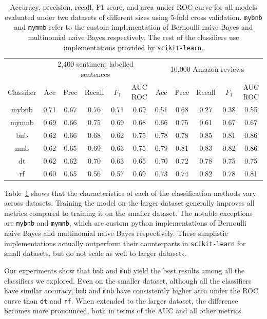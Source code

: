 \documentclass{article} %
\begin{document}
\begin{table}[htbp]
\small
   \centering
   \begin{tabular}{|c|c|c|c|c|c|c|c|c|c|c|}
   \hline
    &  \multicolumn{5}{c|}{2,400 sentiment labelled sentences} &
  \multicolumn{5}{c|}{10,000 Amazon reviews}  \\
  \cline{2-11}
   Classifier & Acc & Prec & Recall & $F_1$ & AUC ROC & Acc & Prec & Recall & $F_1$ & AUC ROC \\ \hline \hline
   mybnb & 0.71 & 0.67 & 0.76 & 0.71 & 0.69 & 0.51 & 0.68 & 0.27 & 0.38 & 0.55 \\\hline
   mymnb & 0.69 & 0.66 & 0.75 & 0.69 & 0.68 & 0.66 & 0.75 & 0.61 & 0.67 & 0.67 \\\hline
   bnb & 0.62 & 0.66 & 0.68 & 0.62 & 0.75 & 0.78 & 0.78 & 0.85 & 0.81 & 0.86 \\\hline
   mnb & 0.62 & 0.65 & 0.69 & 0.63 & 0.75 & 0.79 & 0.81 & 0.83 & 0.82 & 0.86 \\\hline
   dt & 0.62 & 0.62 & 0.70 & 0.63 & 0.65 & 0.70 & 0.72 & 0.78 & 0.75 & 0.75 \\\hline
   rf & 0.60 & 0.65 & 0.56 & 0.57 & 0.69 & 0.73 & 0.74 & 0.82 & 0.78 & 0.81 \\\hline
   \end{tabular}
   \caption{Accuracy, precision, recall, F1 score, and area under ROC curve for all models evaluated under two datasets of different sizes using 5-fold cross validation. \texttt{mybnb} and \texttt{mymnb} refer to the custom implementation of Bernoulli naive Bayes and multinomial naive Bayes respectively. The rest of the classifiers use implementations provided by \texttt{scikit-learn}.}
   \label{tab:classifiers}
\end{table}

Table~\ref{tab:classifiers} shows that the characteristics of each of the classification methods vary across datasets. Training the model on the larger dataset generally improves all metrics compared to training it on the smaller dataset. The notable exceptions are \texttt{mybnb} and \texttt{mymnb}, which are custom python implementations of Bernoulli naive Bayes and multinomial naive Bayes respectively. These simplistic implementations actually outperform their counterparts in \texttt{scikit-learn} for small datasets, but do not scale as well to larger datasets.

Our experiments show that \texttt{bnb} and \texttt{mnb} yield the best results among all the classifiers we explored. Even on the smaller dataset, although all the classifiers have similar accuracy, \texttt{bnb} and \texttt{mnb} have consistently higher area under the ROC curve than \texttt{dt} and \texttt{rf}. When extended to the larger dataset, the difference becomes more pronounced, both in terms of the AUC and all other metrics.
\end{document}
